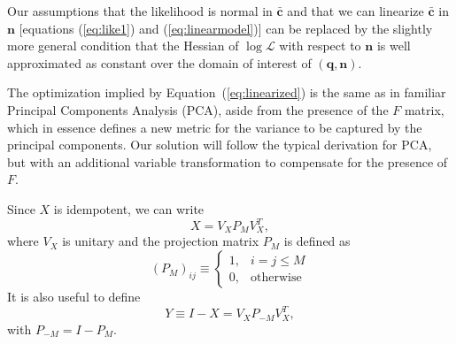 \documentclass[onecolumn,resetfootnote]{aastex7}
\newcommand{\eqq}[1]{Equation~(\ref{#1})}
\newcommand{\vecq}{\ensuremath{\mathbf{q}}}
\newcommand{\vecn}{\ensuremath{\mathbf{n}}}
\newcommand{\hatc}{\ensuremath{\bar{\mathbf{c}}}}
\newcommand{\matF}{F}
\newcommand{\matI}{I}
\newcommand{\matX}{X}
\newcommand{\matY}{Y}
\newcommand{\proj}{P}  %
\newcommand{\likeli}{\mathcal{L}}
\begin{document}
Our assumptions that the likelihood is normal in $\hatc$ and that we can
  linearize $\hatc$ in $\vecn$ [equations (\ref{eq:like1}) and
  (\ref{eq:linearmodel})] can be replaced by the slightly more general condition
  that the Hessian of $\log\likeli$ with respect to $\vecn$ is well approximated
  as constant over the domain of interest of $(\vecq,\vecn)$.

The optimization implied by \eqq{eq:linearized} is the same as in
familiar Principal Components Analysis (PCA), aside from the presence
of the $F$ matrix, which in essence defines a new metric for the
variance to be captured by the principal components.  Our solution will follow the typical derivation
for PCA, but with an additional variable transformation to compensate
for the presence of $\matF.$

Since $\matX$ is idempotent, we can write
\begin{equation}
  \matX = V_X \proj_M V_X^T,
\end{equation}
where $V_X$ is unitary and the projection matrix $\proj_M$ is defined as
\begin{equation}
  \left(\proj_M\right)_{ij} \equiv
\begin{cases}
                                            1,  &  i=j\le M \\
                                            0,  & \text{otherwise}
\end{cases}
\end{equation}
It is also useful to define
\begin{equation}
  \matY \equiv \matI-\matX  = V_X \proj_{-M} V_X^T,
\end{equation}
with $\proj_{-M}=\matI-\proj_M.$  
\end{document}
